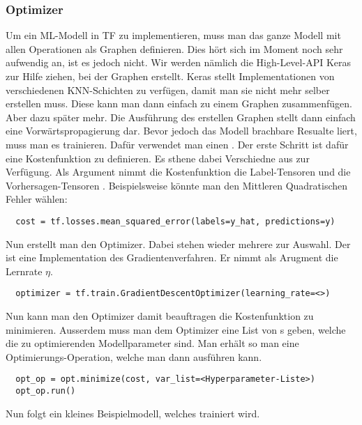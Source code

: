 \subsubsection{Optimizer}
Um ein ML-Modell in TF zu implementieren, muss man das ganze Modell mit
allen Operationen als Graphen definieren. Dies hört sich im Moment noch sehr
aufwendig an, ist es jedoch nicht. Wir werden nämlich die High-Level-API Keras
zur Hilfe ziehen, bei der Graphen erstellt.
Keras stellt Implementationen von verschiedenen KNN-Schichten zu verfügen, damit man sie nicht mehr selber
erstellen muss. Diese kann man dann einfach zu einem Graphen zusammenfügen.
Aber dazu später mehr.
\para{}
Die Ausführung des erstellen Graphen stellt dann einfach eine
Vorwärtspropagierung dar. Bevor jedoch das Modell brachbare Resualte liert,
muss man es trainieren. Dafür verwendet man einen .
\para{}
Der erste Schritt ist dafür eine Kostenfunktion zu definieren. Es sthene dabei
Verschiedne aus  zur Verfügung. Als Argument nimmt die
Kostenfunktion die Label-Tensoren  und die Vorhersagen-Tensoren .
Beispielsweise könnte man den Mittleren Quadratischen Fehler wählen:
\begin{verbatim}
  cost = tf.losses.mean_squared_error(labels=y_hat, predictions=y)
\end{verbatim}
Nun erstellt man den Optimizer. Dabei stehen wieder mehrere zur Auswahl. Der
 ist eine Implementation des
Gradientenverfahren. Er nimmt als Arugment die Lernrate $\eta$.
\begin{verbatim}
  optimizer = tf.train.GradientDescentOptimizer(learning_rate=<>)
\end{verbatim}
Nun kann man den Optimizer damit beauftragen die Kostenfunktion  zu
minimieren. Ausserdem muss man dem Optimizer eine List von s
geben, welche die zu optimierenden Modellparameter sind.
Man erhält so man eine Optimierungs-Operation, welche man dann
ausführen kann.
\begin{verbatim}
  opt_op = opt.minimize(cost, var_list=<Hyperparameter-Liste>)
  opt_op.run()
\end{verbatim}
\para{}
Nun folgt ein kleines Beispielmodell, welches trainiert wird.
